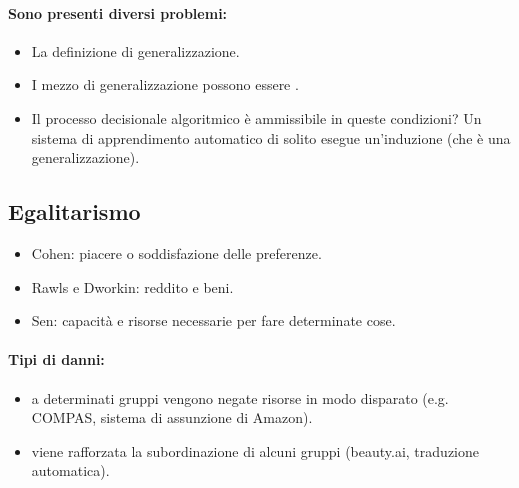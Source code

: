 \paragraph{Sono presenti diversi problemi:}

\begin{itemize}
  \item La definizione di generalizzazione. 
  \item I mezzo di generalizzazione possono essere . 
  \item Il processo decisionale algoritmico è ammissibile in queste condizioni? Un sistema di apprendimento automatico di solito esegue un'induzione (che è una generalizzazione).
\end{itemize}

\subsection{Egalitarismo}




\begin{itemize}
  \item Cohen: piacere o soddisfazione delle preferenze. 
  \item Rawls e Dworkin: reddito e beni. 
  \item Sen: capacità e risorse necessarie per fare determinate cose. 
\end{itemize}


\paragraph{Tipi di danni:}

\begin{itemize}
  \item {} a determinati gruppi vengono negate risorse in modo disparato (e.g. COMPAS, sistema di assunzione di Amazon).
  \item {} viene rafforzata la subordinazione di alcuni gruppi (beauty.ai, traduzione automatica).
\end{itemize}

